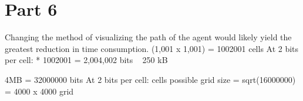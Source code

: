 \documentclass[a4paper,12pt]{article}
\begin{document}
\section{Part 6}
Changing the method of visualizing the path of the agent would likely yield the greatest reduction in time consumption. 
\newline
(1,001 x 1,001) = 1002001 cells \newline
At 2 bits per cell:  * 1002001  = 2,004,002 bits ~ 250 kB \newline \newline

4MB = 32000000 bits \newline
At 2 bits per cell:  cells possible \newline 
	grid size = sqrt(16000000) = 4000 x 4000 grid
\end{document}
